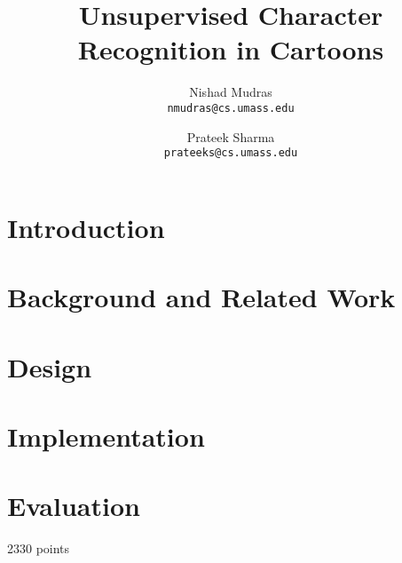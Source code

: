 \documentclass[10pt,twocolumn,letterpaper]{article}
\begin{document}
\title{Unsupervised Character Recognition in Cartoons}

\author{Nishad Mudras \\
{\tt\small nmudras@cs.umass.edu}
\and
Prateek Sharma \\
{\tt\small prateeks@cs.umass.edu}
}

\maketitle

\begin{abstract}
   
\end{abstract}

\section{Introduction}



\section{Background and Related Work}

\section{Design}

\section{Implementation}

\section{Evaluation}
2330 points
\end{document}

